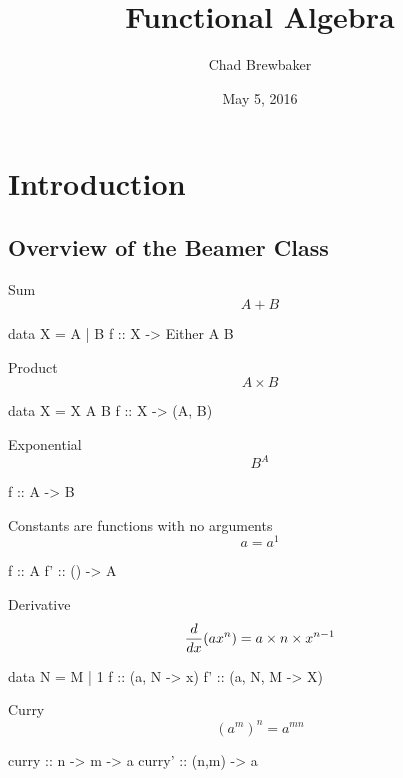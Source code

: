 \documentclass{beamer}
\title{Functional Algebra}
\author{Chad Brewbaker}
\date{May 5, 2016}
\begin{document}
\frame{\titlepage}

\section[Outline]{}
\frame{\tableofcontents}

\section{Introduction}
\subsection{Overview of the Beamer Class}

\begin{frame}[fragile]
Sum
$$ A + B $$
\begin{code} 
data X = A | B
f :: X -> Either A B
\end{code}

\end{frame}


 
 




\begin{frame}[fragile]
Product
$$ A \times B$$
\begin{code}
data X = X A B
f :: X -> (A, B)
\end{code}
\end{frame}

\begin{frame}[fragile]
Exponential
$$ B^{A} $$
\begin{code}
f :: A -> B
\end{code}
\end{frame}


\begin{frame}[fragile]
Constants are functions with no arguments
$$a = a^{1} $$
\begin{code}
f ::  A
f' :: () -> A
\end{code}
\end{frame}




\begin{frame}[fragile]
Derivative
$$ {d \over dx}(ax^{n}) = a \times n \times x^{n-1}$$
\begin{code}
data N = M | 1
f ::  (a, N -> x)
f' :: (a, N, M -> X)
\end{code}
\end{frame}

\begin{frame}[fragile]
Curry
$$ (a^{m})^{n} = a^{mn}$$

\begin{code}
curry :: n -> m -> a
curry' :: (n,m) -> a

\end{code}
\end{frame}
\end{document}
